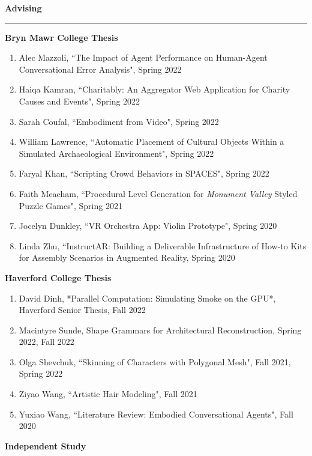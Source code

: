 \needspace{6em}
{\large {\bf Advising}}
\vspace{0.1cm}
\hrule
\medskip
\medskip

{\bf Bryn Mawr College Thesis }
\vspace{-1.0em}

\begin{enumerate}[leftmargin=*,label={}]
\item Alec Mazzoli, ``The Impact of Agent Performance on Human-Agent Conversational Error Analysis", Spring 2022
\item Haiqa Kamran, ``Charitably: An Aggregator Web Application for Charity Causes and Events", Spring 2022
\item Sarah Coufal, ``Embodiment from Video", Spring 2022
\item William Lawrence, ``Automatic Placement of Cultural Objects Within a Simulated Archaeological Environment", Spring 2022
\item Faryal Khan, ``Scripting Crowd Behaviors in SPACES", Spring 2022 
\item Faith Meacham, ``Procedural Level Generation for \textit{Monument Valley} Styled Puzzle Games", Spring 2021
\item Jocelyn Dunkley, ``VR Orchestra App: Violin Prototype", Spring 2020
\item Linda Zhu, ``InstructAR: Building a Deliverable Infrastructure of How-to Kits for Assembly Scenarios in Augmented Reality, Spring 2020
\end{enumerate}

{\bf Haverford College Thesis}
\vspace{-1.0em}

\begin{enumerate}[leftmargin=*,label={}]
\item David Dinh, *Parallel Computation: Simulating Smoke on the GPU*, Haverford Senior Thesis, Fall 2022 
\item Macintyre Sunde, Shape Grammars for Architectural Reconstruction, Spring 2022, Fall 2022
\item Olga Shevchuk, ``Skinning of Characters with Polygonal Mesh", Fall 2021, Spring 2022
\item Ziyao Wang, ``Artistic Hair Modeling", Fall 2021
\item Yuxiao Wang, ``Literature Review: Embodied Conversational Agents", Fall 2020
\end{enumerate}

{\bf Independent Study}
\vspace{-1.0em}

